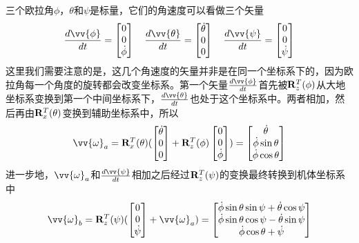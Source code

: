 \documentclass[11pt]{article}
\begin{document}
三个欧拉角$\phi$，$\theta$和$\psi$是标量，它们的角速度可以看做三个矢量
$$
\frac{d\vv{\phi}}{dt} = \begin{bmatrix}0	\\	0	\\ \dot{\phi}	\end{bmatrix} \ \ \ 
\frac{d\vv{\theta}}{dt} = \begin{bmatrix}\dot{\theta}	\\0	\\0	\end{bmatrix} \ \ \ 
\frac{d\vv{\psi}}{dt} = \begin{bmatrix}0	\\	0	\\ \dot{\psi}	\end{bmatrix} 
$$
这里我们需要注意的是，这几个角速度的矢量并非是在同一个坐标系下的，因为欧拉角每一个角度的旋转都会改变坐标系。第一个矢量$\frac{d\vv{\phi}}{dt}$首先被${\bf R}_z^T(\phi)$从大地坐标系变换到第一个中间坐标系下，$\frac{d\vv{\theta}}{dt}$也处于这个坐标系中。两者相加，然后再由${\bf R}_x^T(\theta)$变换到辅助坐标系中，所以
$$
\vv{\omega}_a = {\bf R}_x^T(\theta) (\begin{bmatrix}\dot{\theta}	\\0	\\0	\end{bmatrix} + {\bf R}_z^T(\phi)\begin{bmatrix}0	\\	0	\\ \dot{\phi}	\end{bmatrix})
= \begin{bmatrix}\dot{\theta}	\\ \dot{\phi}\sin\theta	\\ \dot{\phi}\cos\theta	\end{bmatrix}
$$
进一步地，$\vv{\omega}_a$和$\frac{d\vv{\psi}}{dt}$相加之后经过${\bf R}_z^T(\psi)$的变换最终转换到机体坐标系中
\begin{equation}
\vv{\omega}_b = {\bf R}_z^T(\psi)(\begin{bmatrix}0	\\	0	\\ \dot{\psi}	\end{bmatrix} + \vv{\omega}_a) = 
\begin{bmatrix}
 \dot{\phi}\sin\theta\sin\psi + \dot{\theta}\cos\psi	\\
 \dot{\phi}\sin\theta\cos\psi - \dot{\theta}\sin\psi	\\
                    \dot{\phi}\cos\theta + \dot{\psi}	\\
\end{bmatrix}
\end{equation}
\end{document}
